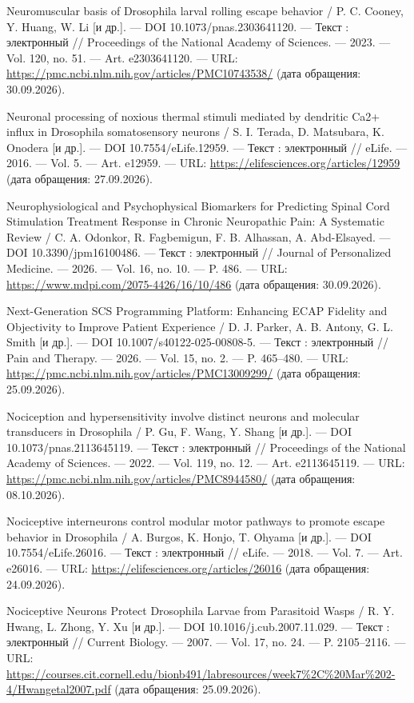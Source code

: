 \begin{list}{}{\setlength{\leftmargin}{10mm}\setlength{\labelwidth}{8mm}\setlength{\labelsep}{2mm}\setlength{\itemsep}{0pt}\setlength{\parsep}{0pt}\setlength{\topsep}{0pt}}
\item[205.] Neuromuscular basis of Drosophila larval rolling escape behavior / P. C. Cooney, Y. Huang, W. Li [и др.]. — DOI 10.1073/pnas.2303641120. — Текст : электронный // Proceedings of the National Academy of Sciences. — 2023. — Vol. 120, no. 51. — Art. e2303641120. — URL: \url{https://pmc.ncbi.nlm.nih.gov/articles/PMC10743538/} (дата обращения: 30.09.2026).
\item[206.] Neuronal processing of noxious thermal stimuli mediated by dendritic Ca2+ influx in Drosophila somatosensory neurons / S. I. Terada, D. Matsubara, K. Onodera [и др.]. — DOI 10.7554/eLife.12959. — Текст : электронный // eLife. — 2016. — Vol. 5. — Art. e12959. — URL: \url{https://elifesciences.org/articles/12959} (дата обращения: 27.09.2026).
\item[207.] Neurophysiological and Psychophysical Biomarkers for Predicting Spinal Cord Stimulation Treatment Response in Chronic Neuropathic Pain: A Systematic Review / C. A. Odonkor, R. Fagbemigun, F. B. Alhassan, A. Abd-Elsayed. — DOI 10.3390/jpm16100486. — Текст : электронный // Journal of Personalized Medicine. — 2026. — Vol. 16, no. 10. — P. 486. — URL: \url{https://www.mdpi.com/2075-4426/16/10/486} (дата обращения: 30.09.2026).
\item[208.] Next-Generation SCS Programming Platform: Enhancing ECAP Fidelity and Objectivity to Improve Patient Experience / D. J. Parker, A. B. Antony, G. L. Smith [и др.]. — DOI 10.1007/s40122-025-00808-5. — Текст : электронный // Pain and Therapy. — 2026. — Vol. 15, no. 2. — P. 465–480. — URL: \url{https://pmc.ncbi.nlm.nih.gov/articles/PMC13009299/} (дата обращения: 25.09.2026).
\item[209.] Nociception and hypersensitivity involve distinct neurons and molecular transducers in Drosophila / P. Gu, F. Wang, Y. Shang [и др.]. — DOI 10.1073/pnas.2113645119. — Текст : электронный // Proceedings of the National Academy of Sciences. — 2022. — Vol. 119, no. 12. — Art. e2113645119. — URL: \url{https://pmc.ncbi.nlm.nih.gov/articles/PMC8944580/} (дата обращения: 08.10.2026).
\item[210.] Nociceptive interneurons control modular motor pathways to promote escape behavior in Drosophila / A. Burgos, K. Honjo, T. Ohyama [и др.]. — DOI 10.7554/eLife.26016. — Текст : электронный // eLife. — 2018. — Vol. 7. — Art. e26016. — URL: \url{https://elifesciences.org/articles/26016} (дата обращения: 24.09.2026).
\item[211.] Nociceptive Neurons Protect Drosophila Larvae from Parasitoid Wasps / R. Y. Hwang, L. Zhong, Y. Xu [и др.]. — DOI 10.1016/j.cub.2007.11.029. — Текст : электронный // Current Biology. — 2007. — Vol. 17, no. 24. — P. 2105–2116. — URL: \url{https://courses.cit.cornell.edu/bionb491/labresources/week7\%2C\%20Mar\%202-4/Hwangetal2007.pdf} (дата обращения: 25.09.2026).

\end{list}
